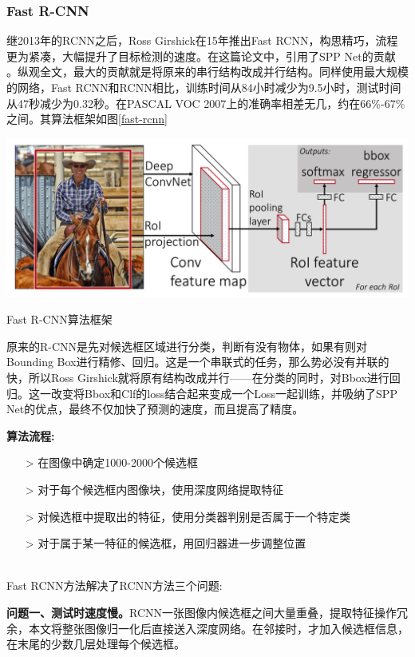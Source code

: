 \subsubsection{Fast R-CNN}
继2013年的RCNN之后，Ross Girshick在15年推出Fast RCNN\cite{fastrcnn}，构思精巧，流程更为紧凑，大幅提升了目标检测的速度。在这篇论文中，引用了SPP Net的贡献 。纵观全文，最大的贡献就是将原来的串行结构改成并行结构。同样使用最大规模的网络，Fast RCNN和RCNN相比，训练时间从84小时减少为9.5小时，测试时间从47秒减少为0.32秒。在PASCAL VOC 2007上的准确率相差无几，约在66\%-67\%之间。其算法框架如图\ref{fast-rcnn}
\begin{uscfigure}
	\includegraphics[width=\textwidth]{./Pictures/fast_rcnn.png}	
	\caption{Fast R-CNN算法框架}	
	\label{fast-rcnn}
\end{uscfigure}
原来的R-CNN是先对候选框区域进行分类，判断有没有物体，如果有则对Bounding Box进行精修、回归。这是一个串联式的任务，那么势必没有并联的快，所以Ross Girshick就将原有结构改成并行——在分类的同时，对Bbox进行回归。这一改变将Bbox和Clf的loss结合起来变成一个Loss一起训练，并吸纳了SPP Net的优点，最终不仅加快了预测的速度，而且提高了精度。

\textbf{算法流程:}

\line
\begin{itemize}
	\setlength{\itemsep}{0pt}
	\setlength{\parsep}{0pt}
	\setlength{\parskip}{0pt}
	\item[>] 在图像中确定1000-2000个候选框 
	\item[>] 对于每个候选框内图像块，使用深度网络提取特征
	\item[>] 对候选框中提取出的特征，使用分类器判别是否属于一个特定类
	\item[>] 对于属于某一特征的候选框，用回归器进一步调整位置
\end{itemize}
\line\\
Fast RCNN方法解决了RCNN方法三个问题:

\textbf{问题一、测试时速度慢。}RCNN一张图像内候选框之间大量重叠，提取特征操作冗余，本文将整张图像归一化后直接送入深度网络。在邻接时，才加入候选框信息，在末尾的少数几层处理每个候选框。

